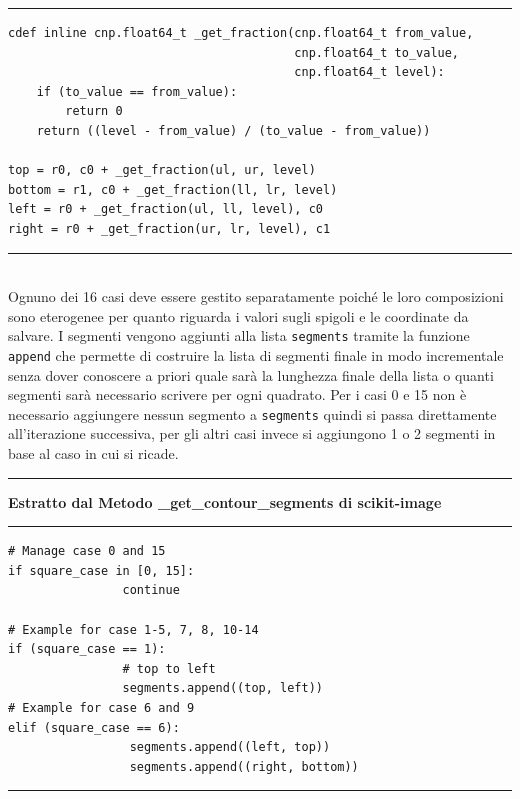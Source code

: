 \documentclass[12pt,a4paper]{report}
\begin{document}
\noindent\rule[0.5ex]{\linewidth}{1pt}
\begin{lstlisting}
cdef inline cnp.float64_t _get_fraction(cnp.float64_t from_value,
                                        cnp.float64_t to_value,
                                        cnp.float64_t level):
    if (to_value == from_value):
        return 0
    return ((level - from_value) / (to_value - from_value))

top = r0, c0 + _get_fraction(ul, ur, level)
bottom = r1, c0 + _get_fraction(ll, lr, level)
left = r0 + _get_fraction(ul, ll, level), c0
right = r0 + _get_fraction(ur, lr, level), c1
\end{lstlisting}
\noindent\rule[0.5ex]{\linewidth}{1pt} \\[10pt]
Ognuno dei 16 casi deve essere gestito separatamente poiché le loro composizioni sono eterogenee per quanto riguarda i valori sugli spigoli e le coordinate da salvare.  
I segmenti vengono aggiunti alla lista  \verb|segments| tramite la funzione  \verb|append| che permette di costruire la lista di segmenti finale in modo incrementale senza dover conoscere a priori quale sarà la lunghezza finale della lista o quanti segmenti sarà necessario scrivere per ogni quadrato.  Per i casi 0 e 15 non è necessario aggiungere nessun segmento a \verb|segments| quindi si passa direttamente all'iterazione successiva, per gli altri casi invece si aggiungono 1 o 2 segmenti in base al caso in cui si ricade.\\[10pt]
\noindent\rule[0.5ex]{\linewidth}{2pt}
\small{\textbf{Estratto dal Metodo \_get\_contour\_segments di scikit-image}} \\
\noindent\rule[0.5ex]{\linewidth}{1pt}
\begin{lstlisting}
# Manage case 0 and 15
if square_case in [0, 15]:
                continue

# Example for case 1-5, 7, 8, 10-14
if (square_case == 1): 
                # top to left
                segments.append((top, left))
# Example for case 6 and 9
elif (square_case == 6):
                 segments.append((left, top))
                 segments.append((right, bottom))
\end{lstlisting}
\noindent\rule[0.5ex]{\linewidth}{1pt} \newpage

\end{document}

